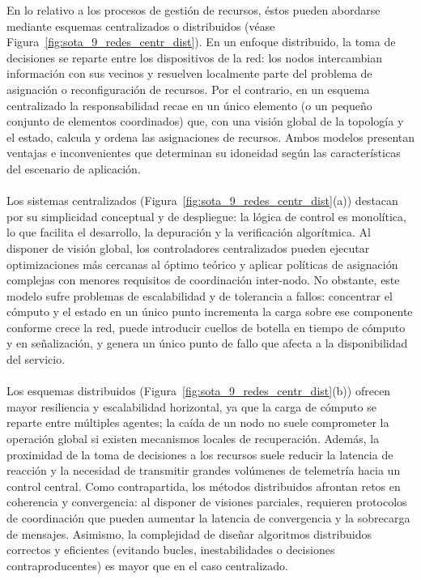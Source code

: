 En lo relativo a los procesos de gestión de recursos, éstos pueden abordarse mediante esquemas centralizados o distribuidos (véase Figura~\ref{fig:sota_9_redes_centr_dist}). En un enfoque distribuido, la toma de decisiones se reparte entre los dispositivos de la red: los nodos intercambian información con sus vecinos y resuelven localmente parte del problema de asignación o reconfiguración de recursos. Por el contrario, en un esquema centralizado la responsabilidad recae en un único elemento (o un pequeño conjunto de elementos coordinados) que, con una visión global de la topología y el estado, calcula y ordena las asignaciones de recursos. Ambos modelos presentan ventajas e inconvenientes que determinan su idoneidad según las características del escenario de aplicación.\\
\\
Los sistemas centralizados (Figura~\ref{fig:sota_9_redes_centr_dist}(a)) destacan por su simplicidad conceptual y de despliegue: la lógica de control es monolítica, lo que facilita el desarrollo, la depuración y la verificación algorítmica. Al disponer de visión global, los controladores centralizados pueden ejecutar optimizaciones más cercanas al óptimo teórico y aplicar políticas de asignación complejas con menores requisitos de coordinación inter-nodo. No obstante, este modelo sufre problemas de escalabilidad y de tolerancia a fallos: concentrar el cómputo y el estado en un único punto incrementa la carga sobre ese componente conforme crece la red, puede introducir cuellos de botella en tiempo de cómputo y en señalización, y genera un único punto de fallo que afecta a la disponibilidad del servicio.\\
\\
Los esquemas distribuidos (Figura~\ref{fig:sota_9_redes_centr_dist}(b)) ofrecen mayor resiliencia y escalabilidad horizontal, ya que la carga de cómputo se reparte entre múltiples agentes; la caída de un nodo no suele comprometer la operación global si existen mecanismos locales de recuperación. Además, la proximidad de la toma de decisiones a los recursos suele reducir la latencia de reacción y la necesidad de transmitir grandes volúmenes de telemetría hacia un control central. Como contrapartida, los métodos distribuidos afrontan retos en coherencia y convergencia: al disponer de visiones parciales, requieren protocolos de coordinación que pueden aumentar la latencia de convergencia y la sobrecarga de mensajes. Asimismo, la complejidad de diseñar algoritmos distribuidos correctos y eficientes (evitando bucles, inestabilidades o decisiones contraproducentes) es mayor que en el caso centralizado.\\
